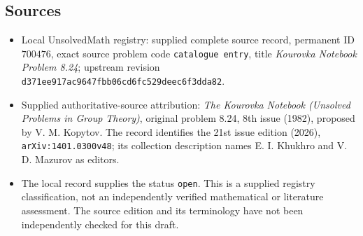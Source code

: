 \documentclass[11pt]{article}
\begin{document}
\subsection{Sources}
\begin{itemize}
\item Local UnsolvedMath registry: supplied complete source record, permanent ID \(700476\), exact source problem code \texttt{catalogue entry}, title \emph{Kourovka Notebook Problem 8.24}; upstream revision \texttt{d371ee917ac9647fbb06cd6fc529deec6f3dda82}.
\item Supplied authoritative-source attribution: \emph{The Kourovka Notebook (Unsolved Problems in Group Theory)}, original problem 8.24, 8th issue (1982), proposed by V. M. Kopytov. The record identifies the 21st issue edition (2026), \texttt{arXiv:1401.0300v48}; its collection description names E. I. Khukhro and V. D. Mazurov as editors.
\item The local record supplies the status \texttt{open}. This is a supplied registry classification, not an independently verified mathematical or literature assessment. The source edition and its terminology have not been independently checked for this draft.
\end{itemize}
\end{document}
